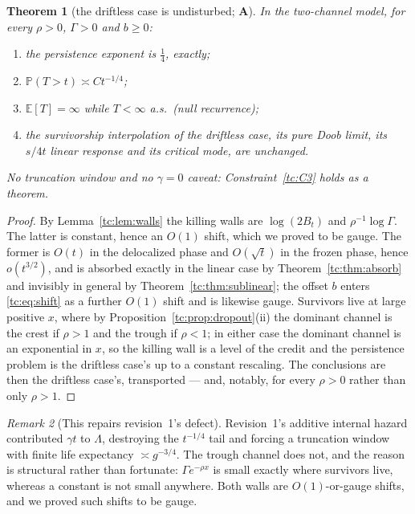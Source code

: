 \documentclass[11pt]{article}
\numberwithin{equation}{section}
\theoremstyle{plain}
\newtheorem{theorem}{Theorem}[section]
\theoremstyle{definition}
\theoremstyle{remark}
\newtheorem{remark}[theorem]{Remark}
\newcommand{\E}{\mathbb{E}}
\newcommand{\PP}{\mathbb{P}}
\begin{document}
\begin{theorem}[the driftless case is undisturbed; \textbf{A}]
\label{tc:thm:survives}
In the two-channel model, for every $\rho>0$, $\Gamma>0$ and $b\ge0$:
\begin{enumerate}[label=\emph{(\roman*)},itemsep=1pt]
\item the persistence exponent is $\tfrac14$, exactly;
\item $\PP(T>t)\asymp Ct^{-1/4}$;
\item $\E[T]=\infty$ while $T<\infty$ a.s.\ (null recurrence);
\item the survivorship interpolation of the driftless case, its pure Doob
limit, its $s/4t$ linear response and its critical mode, are unchanged.
\end{enumerate}
\emph{No truncation window and no $\gamma=0$ caveat}:
Constraint~\ref{tc:C3} holds as a theorem.
\end{theorem}

\begin{proof}
By Lemma~\ref{tc:lem:walls} the killing walls are $\log(2B_t)$ and
$\rho^{-1}\log\Gamma$. The latter is constant, hence an $O(1)$ shift,
which we proved to be gauge. The former is $O(t)$ in the
delocalized phase and $O(\sqrt t)$ in the frozen phase, hence
$o(t^{3/2})$, and is absorbed exactly in the linear case by
Theorem~\ref{tc:thm:absorb} and invisibly in general by
Theorem~\ref{tc:thm:sublinear}; the offset $b$ enters
\eqref{tc:eq:shift} as a further $O(1)$ shift and is likewise gauge.
Survivors live at large positive $x$, where by
Proposition~\ref{tc:prop:dropout}(ii) the dominant channel is the crest
if $\rho>1$ and the trough if $\rho<1$; in either case the dominant
channel is an exponential in $x$, so the killing wall is a level of the
credit and the persistence problem is the driftless case's up to a constant
rescaling. The conclusions are then the driftless case's, transported --- and,
notably, for every $\rho>0$ rather than only $\rho>1$.
\end{proof}

\begin{remark}[This repairs revision~1's defect]\label{tc:rem:repair}
Revision~1's additive internal hazard contributed $\gamma t$ to
$\Lambda$, destroying the $t^{-1/4}$ tail and forcing a truncation
window with finite life expectancy $\asymp g^{-3/4}$. The trough channel
does not, and the reason is structural rather than fortunate:
$\Gamma e^{-\rho x}$ is small exactly where survivors live, whereas a
constant is not small anywhere. Both walls are $O(1)$-or-gauge shifts,
and we proved such shifts to be gauge.
\end{remark}
\end{document}

